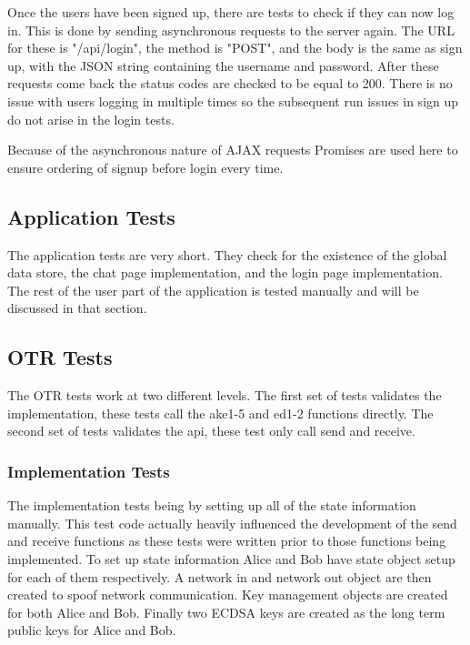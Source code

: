 Once the users have been signed up, there are tests to check if they can now log in. This is done by sending asynchronous requests to the server again. The URL for these is "/api/login", the method is "POST", and the body is the same as sign up, with the JSON string containing the username and password. After these requests come back the status codes are checked to be equal to 200. There is no issue with users logging in multiple times so the subsequent run issues in sign up do not arise in the login tests.


Because of the asynchronous nature of AJAX requests Promises are used here to ensure ordering of signup before login every time.


\subsection{Application Tests}


The application tests are very short. They check for the existence of the global data store, the chat page implementation, and the login page implementation. The rest of the user part of the application is tested manually and will be discussed in that section.


\subsection{OTR Tests}


The OTR tests work at two different levels. The first set of tests validates the implementation, these tests call the ake1-5 and ed1-2 functions directly. The second set of tests validates the api, these test only call send and receive.


\subsubsection{Implementation Tests}


The implementation tests being by setting up all of the state information manually. This test code actually heavily influenced the development of the send and receive functions as these tests were written prior to those functions being implemented. To set up state information Alice and Bob have state object setup for each of them respectively. A network in and network out object are then created to spoof network communication. Key management objects are created for both Alice and Bob. Finally two ECDSA keys are created as the long term public keys for Alice and Bob.


